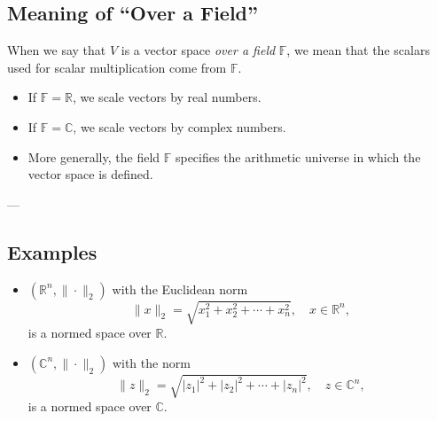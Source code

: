 \documentclass[11pt,a4paper]{article}
\theoremstyle{definition}
\theoremstyle{remark}
\begin{document}
	\subsection*{Meaning of ``Over a Field''}
	
	When we say that $V$ is a vector space \emph{over a field} $\mathbb{F}$, we mean that the scalars used for scalar multiplication come from $\mathbb{F}$. 
	
	\begin{itemize}
		\item If $\mathbb{F}=\mathbb{R}$, we scale vectors by real numbers.
		\item If $\mathbb{F}=\mathbb{C}$, we scale vectors by complex numbers.
		\item More generally, the field $\mathbb{F}$ specifies the arithmetic universe in which the vector space is defined.
	\end{itemize}
	
	---
	
	\subsection*{Examples}
	
	\begin{itemize}
		\item $(\mathbb{R}^n,\|\cdot\|_2)$ with the Euclidean norm
		$$
		\|x\|_2 = \sqrt{x_1^2+x_2^2+\cdots+x_n^2}, \quad x \in \mathbb{R}^n,
		$$
		is a normed space over $\mathbb{R}$.
		
		\item $(\mathbb{C}^n,\|\cdot\|_2)$ with the norm
		$$
		\|z\|_2 = \sqrt{|z_1|^2+|z_2|^2+\cdots+|z_n|^2}, \quad z \in \mathbb{C}^n,
		$$
		is a normed space over $\mathbb{C}$.
	\end{itemize}
	
	
\end{document}
